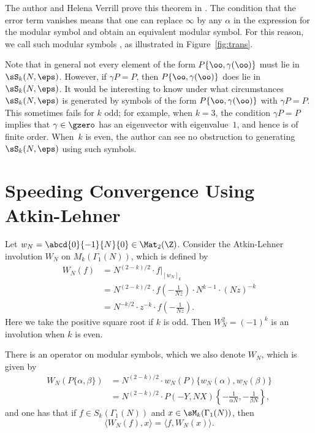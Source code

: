 The author and Helena Verrill prove this theorem 
in \cite{stein-verrill:transportable}. 
The condition
that the error term vanishes means that one can replace
$\infty$ by any $\alpha$ in the expression for the modular symbol
and obtain an equivalent modular symbol.  For this reason,
we call such modular symbols , as illustrated
in Figure~\ref{fig:trans}.

Note that in general not every element of the form
$P\{\oo,\gamma(\oo)\}$ must lie in $\sS_k(N,\eps)$.  However, if
$\gamma P = P$, then $P\{\oo,\gamma(\oo)\}$ does lie in
$\sS_k(N,\eps)$.  It would be interesting to know under what
circumstances $\sS_k(N,\eps)$ is generated by symbols of the form
$P\{\oo,\gamma(\oo)\}$ with $\gamma P = P$.  This sometimes fails for
$k$ odd; for example, when $k=3$, the condition $\gamma P = P$ implies
that $\gamma\in\gzero$ has an eigenvector with eigenvalue~$1$, and hence
is of finite order.  When~$k$ is even, the author can see no
obstruction to generating $\sS_k(N,\eps)$ using such symbols.


\section{Speeding Convergence Using Atkin-Lehner}\label{sec:wntrick}
Let $w_N = \abcd{0}{-1}{N}{\hfill 0} \in \Mat_2(\Z)$.
Consider the Atkin-Lehner involution $W_N$ on $M_k(\Gamma_1(N))$,
which is defined by
\begin{align*}
   W_N(f) &= N^{(2-k)/2} \cdot f|_{[w_N]_k}\\
          &= N^{(2-k)/2} \cdot f\left(-\frac{1}{Nz}\right) \cdot N^{k-1} \cdot (Nz)^{-k}\\
          &= N^{-k/2} \cdot z^{-k} \cdot f\left(-\frac{1}{Nz}\right).
\end{align*}
Here we take the positive square root if $k$ is odd.
Then $W_N^2 = (-1)^k$ is an involution when $k$ is even.

There is an operator on modular symbols, which we also denote
$W_N$, which is given by
\begin{align*}
 W_N(P \{\alpha, \beta\}) &= N^{(2-k)/2} \cdot w_N(P) \{w_N(\alpha), w_N(\beta)\}\\
  &=N^{(2-k)/2} \cdot P(-Y,NX) \left\{-\frac{1}{\alpha N}, -\frac{1}{\beta N}\right\},
 \end{align*}
and one has that if $f \in S_k(\Gamma_1(N))$ and $x\in\sM_k(\Gamma_1(N))$, then
$$
  \langle W_N(f), x\rangle = \langle f, W_N(x) \rangle.
$$

